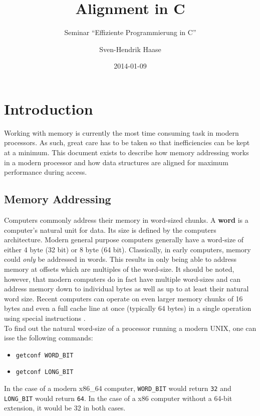 \documentclass[a4paper,12pt]{scrartcl}
\begin{document}
\begin{titlepage}
    \author{Sven-Hendrik Haase}
    \title{Alignment in C}
    \subtitle{Seminar ``Effiziente Programmierung in C''}
    \date{2014-01-09}
    \maketitle
    \thispagestyle{empty}
\end{titlepage}

\tableofcontents

\newpage

\section{Introduction}
Working with memory is currently the most time consuming task in modern processors. As such, great
care has to be taken so that inefficiencies can be kept at a minimum. This document exists to
describe how memory addressing works in a modern processor and how data structures are aligned for
maximum performance during access.

\subsection{Memory Addressing}
Computers commonly address their memory in word-sized chunks. A \textbf{word} is a computer's
natural unit for data. Its size is defined by the computers architecture. Modern general purpose
computers generally have a word-size of either 4 byte (32 bit) or 8 byte (64 bit). Classically,
in early computers, memory could \textit{only} be addressed in words. This results in only being able
to address memory at offsets which are multiples of the word-size. It should be
noted, however, that modern computers do in fact have multiple word-sizes and can address memory
down to individual bytes as well as up to at least their natural word size. Recent computers can
operate on even larger memory chunks of 16 bytes and even a full cache line at once (typically 64
bytes) in a single operation using special instructions \cite{sse4}.\\
To find out the natural word-size of a processor running a modern UNIX, one can isse the following
commands:
\begin{itemize}
    \item \verb|getconf WORD_BIT|
    \item \verb|getconf LONG_BIT|
\end{itemize}
In the case of a modern x86\_64 computer, \verb|WORD_BIT| would return \verb|32| and
\verb|LONG_BIT| would return \verb|64|. In the case of a x86 computer without a 64-bit extension,
it would be 32 in both cases.
\end{document}
